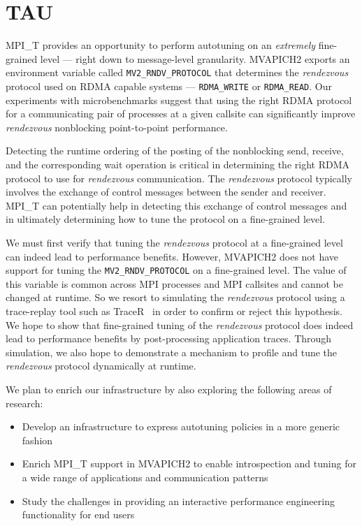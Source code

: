 \section{TAU}
MPI\_T provides an opportunity to perform autotuning on an \textit{extremely} fine-grained level --- right down to message-level granularity. MVAPICH2 exports an environment variable called \verb+MV2_RNDV_PROTOCOL+ that determines the \textit{rendezvous} protocol used on RDMA capable systems --- \verb+RDMA_WRITE+ or \verb+RDMA_READ+. Our experiments with microbenchmarks suggest that using the right RDMA protocol for a communicating pair of processes at a given callsite can significantly improve \textit{rendezvous} nonblocking point-to-point performance. 
\par Detecting the runtime ordering of the posting of the nonblocking send, receive, and the corresponding wait operation is critical in determining the right RDMA protocol to use for \textit{rendezvous} communication. The \textit{rendezvous} protocol typically involves the exchange of control messages between the sender and receiver. MPI\_T can potentially help in detecting this exchange of control messages and in ultimately determining how to tune the protocol on a fine-grained level. 
\par We must first verify that tuning the \textit{rendezvous} protocol at a fine-grained level can indeed lead to performance benefits. However, MVAPICH2 does not have support for tuning the \verb+MV2_RNDV_PROTOCOL+ on a fine-grained level. The value of this variable is common across MPI processes and MPI callsites and cannot be changed at runtime. So we resort to simulating the \textit{rendezvous} protocol using a trace-replay tool such as TraceR~\cite{TraceR} in order to confirm or reject this hypothesis. We hope to show that fine-grained tuning of the \textit{rendezvous} protocol does indeed lead to performance benefits by post-processing application traces. Through simulation, we also hope to demonstrate a mechanism to profile and tune the \textit{rendezvous} protocol dynamically at runtime.
\par We plan to enrich our infrastructure by also exploring the following areas of research:
\begin{itemize}
	\item Develop an infrastructure to express autotuning policies in a more generic fashion
        \item Enrich MPI\_T support in MVAPICH2 to enable introspection and tuning for a wide range of applications and communication patterns
	\item Study the challenges in providing an interactive performance engineering functionality for end users
\end{itemize}

